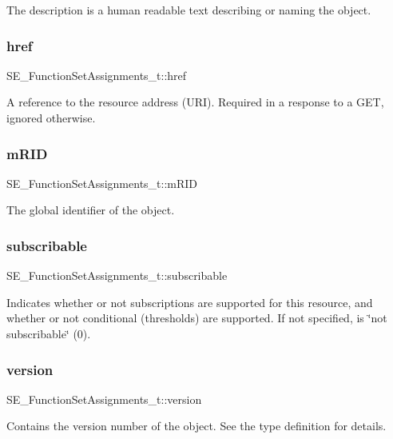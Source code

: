 The description is a human readable text describing or naming the object. \mbox{\label{group__FunctionSetAssignments_ga46858e8380281930bb14b6366e53b409}} 
\subsubsection{\texorpdfstring{href}{href}}
{\footnotesize\ttfamily S\+E\+\_\+\+Function\+Set\+Assignments\+\_\+t\+::href}

A reference to the resource address (U\+RI). Required in a response to a G\+ET, ignored otherwise. \mbox{\label{group__FunctionSetAssignments_gaa16faad1f8ce02dc776c45a3df312b9a}} 
\subsubsection{\texorpdfstring{m\+R\+ID}{mRID}}
{\footnotesize\ttfamily S\+E\+\_\+\+Function\+Set\+Assignments\+\_\+t\+::m\+R\+ID}

The global identifier of the object. \mbox{\label{group__FunctionSetAssignments_ga08bccfbdb77b5bbf15fd21112db0f922}} 
\subsubsection{\texorpdfstring{subscribable}{subscribable}}
{\footnotesize\ttfamily S\+E\+\_\+\+Function\+Set\+Assignments\+\_\+t\+::subscribable}

Indicates whether or not subscriptions are supported for this resource, and whether or not conditional (thresholds) are supported. If not specified, is \char`\"{}not subscribable\char`\"{} (0). \mbox{\label{group__FunctionSetAssignments_ga3d328d9c7ceed42375352905628206b8}} 
\subsubsection{\texorpdfstring{version}{version}}
{\footnotesize\ttfamily S\+E\+\_\+\+Function\+Set\+Assignments\+\_\+t\+::version}

Contains the version number of the object. See the type definition for details. 
